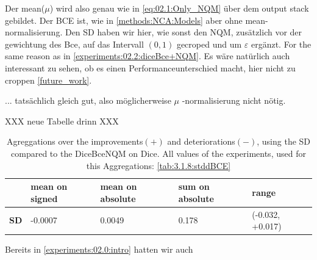 Der mean($\mu$) wird also genau wie in \autoref{eq:02.1:Only_NQM} über dem output stack gebildet. Der BCE ist, wie in \autoref{methods:NCA:Models} aber ohne mean-normalisierung. Den SD haben wir hier, wie sonst den NQM, zusätzlich vor der gewichtung des Bce, auf das Intervall $(0,1)$ gecroped und um $\varepsilon$ ergänzt. For the same reason as in \autoref{experiments:02.2:diceBce+NQM}. Es wäre natürlich auch interessant zu sehen, ob es einen Performanceunterschied macht, hier nicht zu croppen \autoref{future_work}. 

 ... tatsächlich gleich gut, also möglicherweise $\mu$ -normalisierung nicht nötig.

XXX neue Tabelle drinn XXX

\begin{table}[h!]
    \centering
    \begin{tabular}{|l|l|l|l|l|}
        \hline
        \bfseries & mean on signed & mean on absolute & sum on absolute & range\\\hline
        \bfseries SD & -0.0007 & 0.0049 & 0.178 & (-0.032, +0.017)\\\hline
    \end{tabular}
    \caption{Agreggations over the improvements$(+)$ and deteriorations$(-)$, using the SD compared to the DiceBceNQM on Dice. All values of the experiments, used for this Aggregations: \autoref{tab:3.1.8:stddBCE}}
    \label{tab:3.1.8:stddBCE_aggregated}
\end{table}

Bereits in \autoref{experiments:02.0:intro} hatten wir auch 
\iftable

\fi
\fi